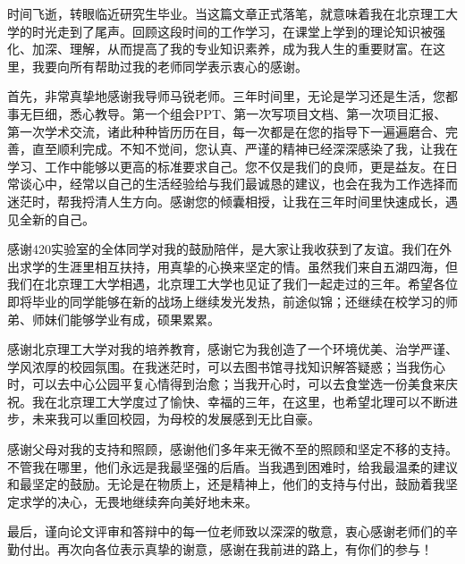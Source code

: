 \begin{acknowledgements}
    时间飞逝，转眼临近研究生毕业。当这篇文章正式落笔，就意味着我在北京理工大学的时光走到了尾声。回顾这段时间的工作学习，在课堂上学到的理论知识被强化、加深、理解，从而提高了我的专业知识素养，成为我人生的重要财富。在这里，我要向所有帮助过我的老师同学表示衷心的感谢。

    首先，非常真挚地感谢我导师马锐老师。三年时间里，无论是学习还是生活，您都事无巨细，悉心教导。第一个组会PPT、第一次写项目文档、第一次项目汇报、第一次学术交流，诸此种种皆历历在目，每一次都是在您的指导下一遍遍磨合、完善，直至顺利完成。不知不觉间，您认真、严谨的精神已经深深感染了我，让我在学习、工作中能够以更高的标准要求自己。您不仅是我们的良师，更是益友。在日常谈心中，经常以自己的生活经验给与我们最诚恳的建议，也会在我为工作选择而迷茫时，帮我捋清人生方向。感谢您的倾囊相授，让我在三年时间里快速成长，遇见全新的自己。

    感谢420实验室的全体同学对我的鼓励陪伴，是大家让我收获到了友谊。我们在外出求学的生涯里相互扶持，用真挚的心换来坚定的情。虽然我们来自五湖四海，但我们在北京理工大学相遇，北京理工大学也见证了我们一起走过的三年。希望各位即将毕业的同学能够在新的战场上继续发光发热，前途似锦；还继续在校学习的师弟、师妹们能够学业有成，硕果累累。

    感谢北京理工大学对我的培养教育，感谢它为我创造了一个环境优美、治学严谨、学风浓厚的校园氛围。在我迷茫时，可以去图书馆寻找知识解答疑惑；当我伤心时，可以去中心公园平复心情得到治愈；当我开心时，可以去食堂选一份美食来庆祝。我在北京理工大学度过了愉快、幸福的三年，在这里，也希望北理可以不断进步，未来我可以重回校园，为母校的发展感到无比自豪。
    
    感谢父母对我的支持和照顾，感谢他们多年来无微不至的照顾和坚定不移的支持。不管我在哪里，他们永远是我最坚强的后盾。当我遇到困难时，给我最温柔的建议和最坚定的鼓励。无论是在物质上，还是精神上，他们的支持与付出，鼓励着我坚定求学的决心，无畏地继续奔向美好地未来。   
        
    最后，谨向论文评审和答辩中的每一位老师致以深深的敬意，衷心感谢老师们的辛勤付出。再次向各位表示真挚的谢意，感谢在我前进的路上，有你们的参与！

\end{acknowledgements}
